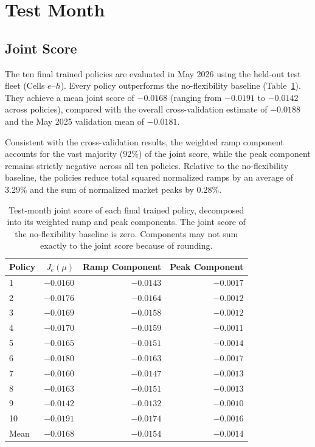 \documentclass{UNCC-thesis}
\begin{document}
\section{Test Month}
\label{sec:results-test}

\subsection{Joint Score}
\label{subsec:results-test-score}

The ten final trained policies are evaluated in May 2026 using the held-out test fleet (Cells
\(e\)--\(h\)). Every policy outperforms the no-flexibility baseline (Table~\ref{tab:test-seeds}).
They achieve a mean joint score of \(-0.0168\) (ranging from \(-0.0191\) to \(-0.0142\) across
policies), compared with the overall cross-validation estimate of \(-0.0188\) and the May 2025
validation mean of \(-0.0181\).

Consistent with the cross-validation results, the weighted ramp component accounts for the vast
majority (92\%) of the joint score, while the peak component remains strictly negative across all
ten policies. Relative to the no-flexibility baseline, the policies reduce total squared normalized
ramps by an average of 3.29\% and the sum of normalized market peaks by 0.28\%.

\begin{table}[htbp]
  \centering
  \footnotesize
  \caption[Test-month joint score of each final policy]{Test-month joint score of each final
  trained policy, decomposed into its weighted ramp and peak components. The joint score of the
  no-flexibility baseline is zero. Components may not sum exactly to the joint score because of
  rounding.}
  \label{tab:test-seeds}
  \begin{tabular}{@{}lrrr@{}}
    \toprule
    Policy & \(J_e(\mu)\) & Ramp Component & Peak Component \\
    \midrule
    1 & \(-0.0160\) & \(-0.0143\) & \(-0.0017\) \\
    2 & \(-0.0176\) & \(-0.0164\) & \(-0.0012\) \\
    3 & \(-0.0169\) & \(-0.0158\) & \(-0.0012\) \\
    4 & \(-0.0170\) & \(-0.0159\) & \(-0.0011\) \\
    5 & \(-0.0165\) & \(-0.0151\) & \(-0.0014\) \\
    6 & \(-0.0180\) & \(-0.0163\) & \(-0.0017\) \\
    7 & \(-0.0160\) & \(-0.0147\) & \(-0.0013\) \\
    8 & \(-0.0163\) & \(-0.0151\) & \(-0.0013\) \\
    9 & \(-0.0142\) & \(-0.0132\) & \(-0.0010\) \\
    10 & \(-0.0191\) & \(-0.0174\) & \(-0.0016\) \\
    \midrule
    Mean & \(-0.0168\) & \(-0.0154\) & \(-0.0014\) \\
    \bottomrule
  \end{tabular}
\end{table}
\end{document}
